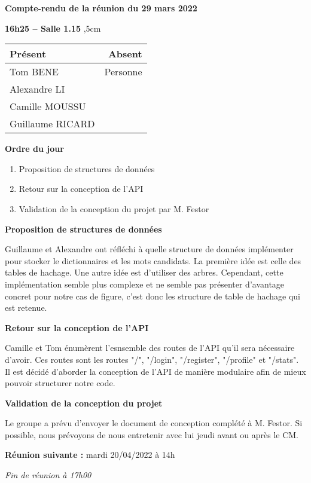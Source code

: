 \documentclass[12pt,a4paper,final]{report}
\begin{document}
\begin{center}
\Large \textbf{Compte-rendu de la réunion du 29 mars 2022}
\end{center}
\textbf{16h25 -- Salle 1.15}
,5cm

\begin{center}
\begin{tabular}{|l|r|}
    \hline
    Présent & Absent \\
    \hline
    Tom BENE & Personne \\
    Alexandre LI & \\
    Camille MOUSSU & \\
    Guillaume RICARD & \\
    \hline
\end{tabular}
\end{center}

\begin{flushleft}
    \textbf{Ordre du jour}
\end{flushleft}

\begin{enumerate}
    \item Proposition de structures de données
	\item Retour sur la conception de l'API
    \item Validation de la conception du projet par M. Festor

\end{enumerate}

\begin{flushleft}
    \textbf{Proposition de structures de données}
\end{flushleft}
Guillaume et Alexandre ont réfléchi à quelle structure de données implémenter pour stocker le dictionnaires et les mots candidats. La première idée est celle des tables de hachage. Une autre idée est d'utiliser des arbres. Cependant, cette implémentation semble plus complexe et ne semble pas présenter d'avantage concret pour notre cas de figure, c'est donc les structure de table de hachage qui est retenue. 

\begin{flushleft}
    \textbf{Retour sur la conception de l'API}
\end{flushleft}
Camille et Tom énumèrent l'esnsemble des routes de l'API qu'il sera nécessaire d'avoir. Ces routes sont les routes "/", "/login", "/register", "/profile" et "/stats". \\
Il est décidé d'aborder la conception de l'API de manière modulaire afin de mieux pouvoir structurer notre code.

\begin{flushleft}
    \textbf{Validation de la conception du projet}
\end{flushleft}
Le groupe a prévu d'envoyer le document de conception complété à M. Festor. Si possible, nous prévoyons de nous entretenir avec lui jeudi avant ou après le CM.

\begin{flushleft}
    \textbf{Réunion suivante :} mardi 20/04/2022 à 14h
\end{flushleft}

\textit{Fin de réunion à 17h00}
\end{document}
